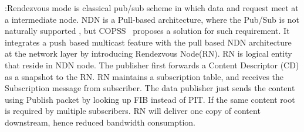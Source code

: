 \vspace{1mm}:Rendezvous mode is classical pub/sub scheme in which data and request meet at a intermediate node. NDN is a Pull-based architecture, where the Pub/Sub is not naturally supported , but COPSS~\cite{chen2011copss} proposes a solution for such requirement. It integrates a push based multicast feature with the pull based NDN architecture at the network layer by introducing Rendezvous Node(RN). RN is logical entity that reside in NDN node. The publisher first forwards a Content Descriptor (CD) as a snapshot to the RN. RN maintains a subscription table, and receives the Subscription message from subscriber. The data publisher just sends the content using Publish packet by looking up FIB instead of PIT. If the same content root is required by multiple subscribers. RN will deliver one copy  of content downstream, hence reduced bandwidth consumption.

